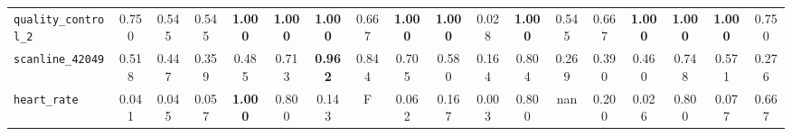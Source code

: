 \begin{tabular}{lccccccccccccccccc}
\midrule
\verb+quality_control_2+ & 0.750 & 0.545 & 0.545 & \textbf{1.000} & \textbf{1.000} & \textbf{1.000} & 0.667 & \textbf{1.000} & \textbf{1.000} & 0.028 & \textbf{1.000} & 0.545 & 0.667 & \textbf{1.000} & \textbf{1.000} & \textbf{1.000} & 0.750\\
\verb+scanline_42049+ & 0.518 & 0.447 & 0.359 & 0.485 & 0.713 & \textbf{0.962} & 0.844 & 0.705 & 0.580 & 0.164 & 0.804 & 0.269 & 0.390 & 0.460 & 0.748 & 0.571 & 0.276\\
\verb+heart_rate+ & 0.041 & 0.045 & 0.057 & \textbf{1.000} & 0.800 & 0.143 & F & 0.062 & 0.167 & 0.003 & 0.800 & nan & 0.200 & 0.026 & 0.800 & 0.077 & 0.667\\
\bottomrule
\end{tabular}
